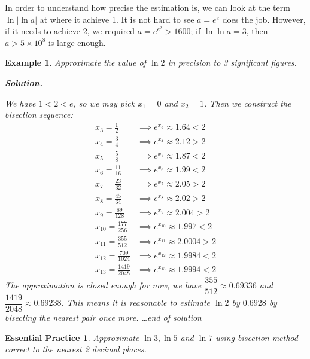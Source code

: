 \documentclass[12pt]{article}
\newtheorem*{example}{Example}
\newtheorem{exercise}{Essential Practice}[section]
\newenvironment{solution}{\begin{snugshade*} \underline{\textbf{Solution.}} \par}{\hfill \textit{\dots end of solution} \end{snugshade*}}
\begin{document}
    In order to understand how precise the estimation is, we can look at the term $\ln|\ln{a}|$ at where it achieve 1. It is not hard to see $a=e^{e}$ does the job. However, if it needs to achieve 2, we required $a=e^{e^2}> 1600$; if $\ln{\ln{a}}=3$, then $a>5\times 10^8$ is large enough.

    \begin{example}
        Approximate the value of $\ln{2}$ in precision to 3 significant figures.

        \begin{solution}
            We have $1<2<e$, so we may pick $x_1=0$ and $x_2=1$. Then we construct the bisection sequence:\begin{align*}
                x_3=\frac{1}{2} &\implies e^{x_3}\approx 1.64 < 2\\
                x_4=\frac{3}{4} &\implies e^{x_4}\approx 2.12 > 2\\
                x_5=\frac{5}{8} &\implies e^{x_5}\approx 1.87 < 2\\
                x_6=\frac{11}{16} &\implies e^{x_6}\approx 1.99 < 2\\
                x_7=\frac{23}{32} &\implies e^{x_7}\approx 2.05 > 2\\
                x_8=\frac{45}{64} &\implies e^{x_8}\approx 2.02 > 2\\
                x_9=\frac{89}{128} &\implies e^{x_9}\approx 2.004 > 2\\
                x_{10}=\frac{177}{256} &\implies e^{x_{10}}\approx 1.997 < 2\\
                x_{11}=\frac{355}{512} &\implies e^{x_{11}}\approx 2.0004 > 2\\
                x_{12}=\frac{709}{1024} &\implies e^{x_{12}}\approx 1.9984 < 2\\
                x_{13}=\frac{1419}{2048} &\implies e^{x_{13}}\approx 1.9994 < 2
            \end{align*}
            The approximation is closed enough for now, we have $\dfrac{355}{512}\approx 0.69336$ and $\dfrac{1419}{2048}\approx 0.69238$. This means it is reasonable to estimate $\ln{2}$ by $0.6928$ by bisecting the nearest pair once more.
        \end{solution}
    \end{example}

    \begin{exercise}
        Approximate $\ln{3}, \ln{5}$ and $\ln{7}$ using bisection method correct to the nearest 2 decimal places.
    \end{exercise}
\end{document}
